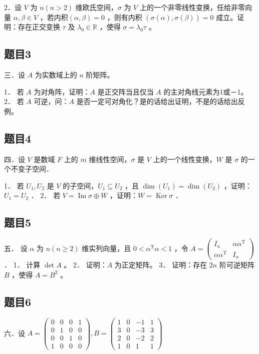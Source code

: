 \documentclass{article}
\begin{document}
2．设 \(V\) 为 \(n(n>2)\) 维欧氏空间，\(\sigma\) 为 \(V\) 上的一个非零线性变换，任给非零向量 \(\alpha, \beta \in V\) ，若内积\((\alpha, \beta)=0\) ，则有内积 \((\sigma(\alpha), \sigma(\beta))=0\) 成立。证明：存在正交变换 \(\tau\) 及 \(\lambda_{0} \in \mathbb{R}\) ，使得 \(\sigma=\lambda_{0} \tau\) 。

\subsection{题目3}
三．设 \(A\) 为实数域上的 \(n\) 阶矩阵。

1． 若 \(A\) 为对角阵，证明：\(A\) 是正交阵当且仅当 \(A\) 的主对角线元素为1或－1。
2． 若 \(A\) 可逆，问：\(A\) 是否一定可对角化？是的话给出证明，不是的话给出反例。

\subsection{题目4}
四．设 \(V\) 是数域 \(F\) 上的 \(m\) 维线性空间，\(\sigma\) 是 \(V\) 上的一个线性变换，\(W\) 是 \(\sigma\) 的一个不变子空间．

1． 若 \(U_{1}, U_{2}\) 是 \(V\) 的子空间，\(U_{1} \subseteq U_{2}\) ，且 \(\operatorname{dim}\left(U_{1}\right)=\operatorname{dim}\left(U_{2}\right)\) ，证明：\(U_{1}=U_{2}\) ．
2． 若 \(V=\operatorname{Im} \sigma \oplus W\) ，证明：\(W=\operatorname{Ker} \sigma\) ．

\subsection{题目5}
五． 设 \(\alpha\) 为 \(n(n \geq 2)\) 维实列向量，且 \(0<\alpha^{\mathrm{T}} \alpha<1\) ，令 \(A=\left(\begin{array}{cc}I_{n} & \alpha \alpha^{\mathrm{T}} \\ \alpha \alpha^{\mathrm{T}} & I_{n}\end{array}\right)\) ．
1． 计算 \(\operatorname{det} A\) 。
2． 证明：\(A\) 为正定矩阵。
3． 证明：存在 \(2 n\) 阶可逆矩阵 \(B\) ，使得 \(A=B^{2}\) 。

\subsection{题目6}
六．设 \(A=\left(\begin{array}{llll}0 & 0 & 0 & 1 \\ 0 & 1 & 0 & 0 \\ 0 & 0 & 1 & 0 \\ 1 & 0 & 0 & 0\end{array}\right), B=\left(\begin{array}{cccc}1 & 0 & -1 & 1 \\ 3 & 0 & -3 & 3 \\ 2 & 0 & -2 & 2 \\ 1 & 0 & 1 & 1\end{array}\right)\)
\end{document}
